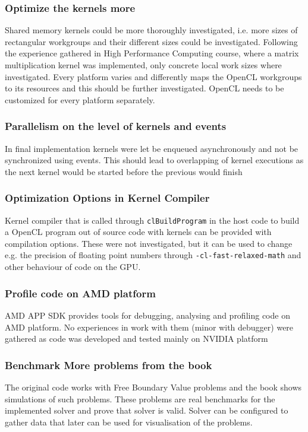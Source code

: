 \subsubsection{Optimize the kernels more}
Shared memory kernels could be more thoroughly investigated, i.e. more sizes of rectangular workgroups and their different sizes could be investigated. Following the experience gathered in High Performance Computing course, where a matrix multiplication kernel was implemented, only concrete local work sizes where investigated. Every platform varies and differently maps the OpenCL workgroups to its resources and this should be further investigated. OpenCL needs to be customized for every platform separately. 

\subsubsection{Parallelism on the level of kernels and events}
In final implementation kernels were let be enqueued asynchronously and not be synchronized using events. This should lead to overlapping of kernel executions as the next kernel would be started before the previous would finish

\subsubsection{Optimization Options in Kernel Compiler}
Kernel compiler that is called through \texttt{clBuildProgram} in the host code to build a OpenCL program out of source code with kernels can be provided with compilation options. These were not investigated, but it can be used to change e.g. the precision of floating point numbers through \texttt{-cl-fast-relaxed-math} and other behaviour of code on the GPU.

\subsubsection{Profile code on AMD platform}
AMD APP SDK provides tools for debugging, analysing and profiling code on AMD platform. No  experiences in work with them (minor with debugger) were gathered as code was developed and tested mainly on NVIDIA platform 

\subsubsection{Benchmark More problems from the book}
The original code works with Free Boundary Value problems and the book shows simulations of such problems. These problems are real benchmarks for the implemented solver and prove that solver is valid. Solver can be configured to gather data that later can be used for visualisation of the problems.

